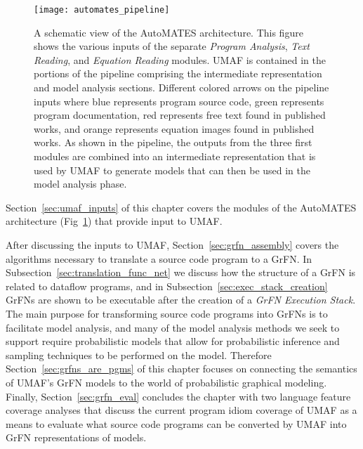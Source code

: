 \begin{figure}[!htbp]
    \centering
    \texttt{[image: automates\_pipeline]}%
    \caption[The AutoMATES Pipeline]{A schematic view of the AutoMATES architecture. This figure shows the various inputs of the separate \textit{Program Analysis}, \textit{Text Reading}, and \textit{Equation Reading} modules. UMAF is contained in the portions of the pipeline comprising the intermediate representation and model analysis sections. Different colored arrows on the pipeline inputs where blue represents program source code, green represents program documentation, red represents free text found in published works, and orange represents equation images found in published works. As shown in the pipeline, the outputs from the three first modules are combined into an intermediate representation that is used by UMAF to generate models that can then be used in the model analysis phase.}
    \label{fig:automates_pipeline}
\end{figure}

Section~\ref{sec:umaf_inputs} of this chapter covers the modules of the AutoMATES architecture (Fig~\ref{fig:automates_pipeline}) that provide input to UMAF.

After discussing the inputs to UMAF, Section~\ref{sec:grfn_assembly} covers the algorithms necessary to translate a source code program to a GrFN.
In Subsection~\ref{sec:translation_func_net} we discuss how the structure of a GrFN is related to dataflow programs, and in Subsection~\ref{sec:exec_stack_creation} GrFNs are shown to be executable after the creation of a \textit{GrFN Execution Stack}.
The main purpose for transforming source code programs into GrFNs is to facilitate model analysis, and many of the model analysis methods we seek to support require probabilistic models that allow for probabilistic inference and sampling techniques to be performed on the model.
Therefore Section~\ref{sec:grfns_are_pgms} of this chapter focuses on connecting the semantics of UMAF's GrFN models to the world of probabilistic graphical modeling.
Finally, Section~\ref{sec:grfn_eval} concludes the chapter with two language feature coverage analyses that discuss the current program idiom coverage of UMAF as a means to evaluate what source code programs can be converted by UMAF into GrFN representations of models.

